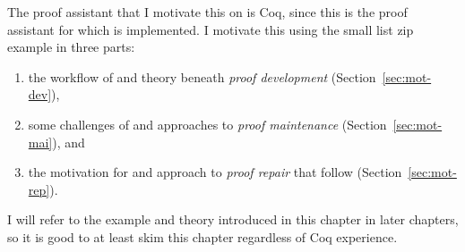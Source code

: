 The proof assistant that I motivate this on is Coq, since this is the proof assistant for which \sysnamelong is implemented.
I motivate this using the small list zip example in three parts:

\begin{enumerate}
\item the workflow of and theory beneath \textit{proof development} (Section~\ref{sec:mot-dev}),
\item some challenges of and approaches to \textit{proof maintenance} (Section~\ref{sec:mot-mai}), and
\item the motivation for and approach to \textit{proof repair} that follow (Section~\ref{sec:mot-rep}).
\end{enumerate}
I will refer to the example and theory introduced in this chapter in later chapters, so it is good to at least skim this chapter regardless of Coq experience.






